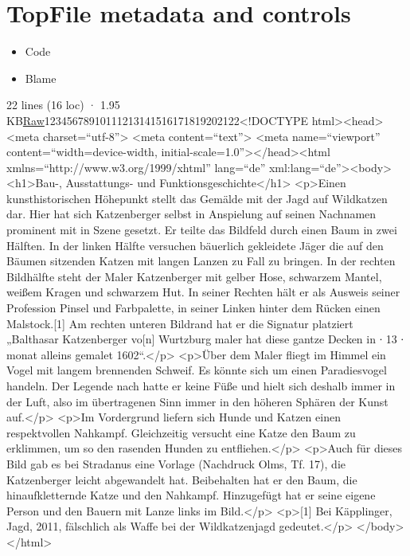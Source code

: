 \documentclass[
  letterpaper,
]{book}
\providecommand{\tightlist}{%
  \setlength{\itemsep}{0pt}\setlength{\parskip}{0pt}}\usepackage{longtable,booktabs,array}
\begin{document}
\section{TopFile metadata and
controls}\label{topfile-metadata-and-controls-1}

\begin{itemize}
\tightlist
\item
  Code
\item
  Blame
\end{itemize}

22 lines (16 loc) · 1.95
KB\href{https://github.com/shionkim/CPS-Demo/raw/main/text/wildkatzenjagd.html}{Raw}12345678910111213141516171819202122\textless!DOCTYPE
html\textgreater\textless head\textgreater{} \textless meta
charset=``utf-8''\textgreater{} \textless meta
content=``text''\textgreater{} \textless meta name=``viewport''
content=``width=device-width,
initial-scale=1.0''\textgreater\textless/head\textgreater\textless html
xmlns=``http://www.w3.org/1999/xhtml'' lang=``de''
xml:lang=``de''\textgreater\textless body\textgreater{}
\textless h1\textgreater Bau-, Ausstattungs- und
Funktionsgeschichte\textless/h1\textgreater{}
\textless p\textgreater Einen kunsthistorischen Höhepunkt stellt das
Gemälde mit der Jagd auf Wildkatzen dar. Hier hat sich Katzenberger
selbst in Anspielung auf seinen Nachnamen prominent mit in Szene
gesetzt. Er teilte das Bildfeld durch einen Baum in zwei Hälften. In der
linken Hälfte versuchen bäuerlich gekleidete Jäger die auf den Bäumen
sitzenden Katzen mit langen Lanzen zu Fall zu bringen. In der rechten
Bildhälfte steht der Maler Katzenberger mit gelber Hose, schwarzem
Mantel, weißem Kragen und schwarzem Hut. In seiner Rechten hält er als
Ausweis seiner Profession Pinsel und Farbpalette, in seiner Linken
hinter dem Rücken einen Malstock.{[}1{]} Am rechten unteren Bildrand hat
er die Signatur platziert „Balthasar Katzenberger vo{[}n{]} Wurtzburg
maler hat diese gantze Decken in ∙ 13 ∙ monat alleins gemalet
1602``.\textless/p\textgreater{} \textless p\textgreater Über dem Maler
fliegt im Himmel ein Vogel mit langem brennenden Schweif. Es könnte sich
um einen Paradiesvogel handeln. Der Legende nach hatte er keine Füße und
hielt sich deshalb immer in der Luft, also im übertragenen Sinn immer in
den höheren Sphären der Kunst auf.\textless/p\textgreater{}
\textless p\textgreater Im Vordergrund liefern sich Hunde und Katzen
einen respektvollen Nahkampf. Gleichzeitig versucht eine Katze den Baum
zu erklimmen, um so den rasenden Hunden zu
entfliehen.\textless/p\textgreater{} \textless p\textgreater Auch für
dieses Bild gab es bei Stradanus eine Vorlage (Nachdruck Olms, Tf. 17),
die Katzenberger leicht abgewandelt hat. Beibehalten hat er den Baum,
die hinaufkletternde Katze und den Nahkampf. Hinzugefügt hat er seine
eigene Person und den Bauern mit Lanze links im
Bild.\textless/p\textgreater{} \textless p\textgreater{[}1{]} Bei
Käpplinger, Jagd, 2011, fälschlich als Waffe bei der Wildkatzenjagd
gedeutet.\textless/p\textgreater{}
\textless/body\textgreater\textless/html\textgreater{}
\end{document}

